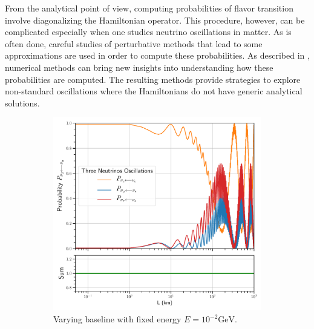 \documentclass[twocolumn,secnumarabic,amssymb, nobibnotes, aps, prd,10pt]{revtex4-1}
\begin{document}
From the analytical point of view, computing probabilities of flavor transition involve
diagonalizing the Hamiltonian operator. This procedure, however, can be complicated especially
when one studies neutrino oscillations in matter. As is often done, careful studies of
perturbative methods that lead to some approximations are used in order to compute these
probabilities. As described in \cite{Bustamante:2019ggq}, numerical methods can bring new insights 
into understanding how these probabilities are computed. The resulting methods provide strategies
to explore non-standard oscillations where the Hamiltonians do not have generic analytical
solutions. 
\begin{figure}
\captionsetup[subfigure]{aboveskip=-1.5pt,belowskip=-1.5pt} 
\begin{subfigure}{1.05\linewidth}
\includegraphics[width=\linewidth]{Osc3VacuumBaseline.pdf}
\caption{Varying baseline with fixed energy $E=10^{-2} \mathrm{GeV}$.} 
\label{higgs:sspt} 
\end{subfigure} 
\\
\begin{subfigure}{1.05\linewidth}

\end{subfigure}
\end{figure}
\end{document}
